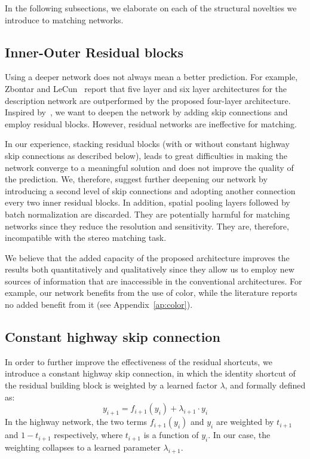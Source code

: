 \documentclass[10pt, twocolumn, letterpaper]{article}
\begin{document}
In the following subsections, we elaborate on each of the structural novelties we introduce to matching networks.


\subsection{Inner-Outer Residual blocks}

Using a deeper network does not always mean a better prediction. For example, Zbontar and LeCun~\cite{newlecun} report that five layer and six layer architectures for the description network are outperformed by the proposed four-layer architecture. Inspired by~\cite{residual}, we want to deepen the network by adding skip connections and employ residual blocks. However, residual networks are ineffective for matching. 

In our experience, stacking residual blocks (with or without constant highway skip connections as described below), leads to great difficulties in making the network converge to a meaningful solution and does not improve the quality of the prediction. We, therefore, suggest further deepening our network by introducing a second level of skip connections and adopting another connection every two inner residual blocks. In addition, spatial pooling layers followed by batch normalization are discarded. They are potentially harmful for matching networks since they reduce the resolution and sensitivity. They are, therefore, incompatible with the stereo matching task. 

We believe that the added capacity of the proposed architecture improves the results both quantitatively and  qualitatively since they allow us to employ new sources of information that are inaccessible in the conventional architectures. For example, our network benefits from the use of color, while the literature reports no added benefit from it (see Appendix~\ref{ap:color}).

\subsection{Constant highway skip connection}
\label{sec:lambda}

In order to further improve the effectiveness of the residual shortcuts, we introduce a constant highway skip connection, in which the identity shortcut of the residual building block is weighted by a learned factor $\lambda$, and formally defined as: 
\begin{equation}
y_{i+1} =  f_{i+1}(y_i) +\lambda_{i+1} \cdot y_i
\end{equation}
In the highway network, the two terms $f_{i+1}(y_i)$ and $y_i$ are weighted by $t_{i+1}$ and $1-t_{i+1}$ respectively, where $t_{i+1}$ is a function of $y_i$. In our case, the weighting collapses to a learned parameter $\lambda_{i+1}$. 
\end{document}
